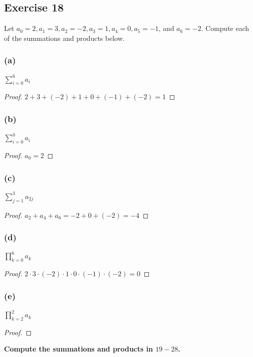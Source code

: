 \documentclass[14pt]{extarticle}
\newcommand{\dps}{\displaystyle}
\newcommand{\cy}{\color{cyan}}
\begin{document}
\subsection{Exercise 18}
Let $a_0 = 2, a_1 = 3, a_2 = -2, a_3 = 1, a_4 = 0, a_5 = -1$, and $a_6 = -2$. Compute each of the summations and products below.

\subsubsection{(a)}
$\dps\sum_{i=0}^{6}a_i$

\begin{proof}
$2 + 3 + (-2) + 1 + 0 + (-1) + (-2) = 1$

\end{proof}

\subsubsection{(b)}
$\dps\sum_{i=0}^{0}a_i$

\begin{proof}
$a_0 = 2$
\end{proof}

\subsubsection{(c)}
$\dps\sum_{j=1}^{3}a_{2j}$

\begin{proof}
$a_2 + a_4 + a_6 = -2 + 0 + (-2) = -4$
\end{proof}

\subsubsection{(d)}
$\dps\prod_{k=0}^{6}a_k$

\begin{proof}
$2 \cdot 3 \cdot (-2) \cdot 1 \cdot 0 \cdot (-1) \cdot (-2) = 0$
\end{proof}

\subsubsection{(e)}
$\dps\prod_{k=2}^{2}a_k$

\begin{proof}

\end{proof}

{\bf\cy Compute the summations and products in $19-28$.}
\end{document}
